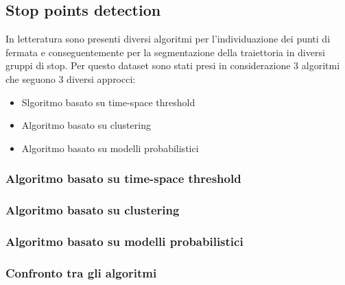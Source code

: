\documentclass[12pt]{article}
\begin{document}
\subsection{Stop points detection}
In letteratura sono presenti diversi algoritmi per l'individuazione dei punti di fermata e conseguentemente per la segmentazione della traiettoria in diversi gruppi di stop. Per questo dataset sono stati presi in considerazione 3 algoritmi che seguono 3 diversi approcci:
\begin{itemize}
    \item Slgoritmo basato su time-space threshold
    \item Algoritmo basato su clustering
    \item Algoritmo basato su modelli probabilistici
\end{itemize}
\subsubsection{Algoritmo basato su time-space threshold}
\subsubsection{Algoritmo basato su clustering}
\subsubsection{Algoritmo basato su modelli probabilistici}
\subsubsection{Confronto tra gli algoritmi}
\newpage
\end{document}
